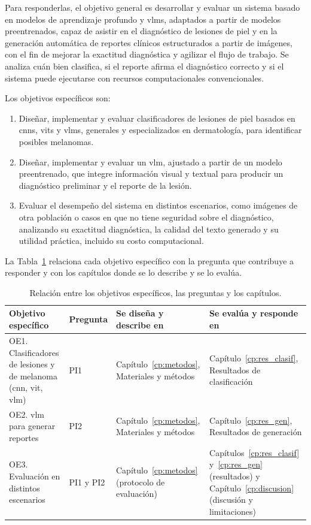 Para responderlas, el objetivo general es desarrollar y evaluar un sistema basado en modelos de aprendizaje
profundo y \glspl{vlm}, adaptados a partir de modelos preentrenados, capaz de asistir en el diagnóstico de lesiones de piel y en la
generación automática de reportes clínicos estructurados a partir de imágenes, con el fin de mejorar la
exactitud diagnóstica y agilizar el flujo de trabajo. Se analiza cuán bien clasifica, si el reporte afirma el
diagnóstico correcto y si el sistema puede ejecutarse con recursos computacionales convencionales.

Los objetivos específicos son:
\begin{enumerate}[label=\textbf{OE\arabic*.}]
  \item Diseñar, implementar y evaluar clasificadores de lesiones de piel basados en \glspl{cnn}, \glspl{vit}
  y \glspl{vlm}, generales y especializados en dermatología, para identificar posibles melanomas.
  \item Diseñar, implementar y evaluar un \gls{vlm}, ajustado a partir de un modelo preentrenado, que integre
  información visual y textual para producir un diagnóstico preliminar y el reporte de la lesión.
  \item Evaluar el desempeño del sistema en distintos escenarios, como imágenes de otra población o casos en
  que no tiene seguridad sobre el diagnóstico, analizando su exactitud diagnóstica, la calidad del texto
  generado y su utilidad práctica, incluido su costo computacional.
\end{enumerate}

La Tabla~\ref{tab:intro_objetivos_preguntas} relaciona cada objetivo específico con la pregunta que contribuye a
responder y con los capítulos donde se lo describe y se lo evalúa.

\begin{table}[H]
  \centering
  \caption{Relación entre los objetivos específicos, las preguntas y los capítulos.}
  \label{tab:intro_objetivos_preguntas}
  \small
  \begin{tabularx}{\textwidth}{@{}>{\raggedright\arraybackslash}p{}p{}
    >{\raggedright\arraybackslash}X>{\raggedright\arraybackslash}X@{}}
    \toprule
    \textbf{Objetivo específico} & \textbf{Pregunta} & \textbf{Se diseña y describe en} & \textbf{Se evalúa y responde en} \\
    \midrule
    OE1. Clasificadores de lesiones y de melanoma (\gls{cnn}, \gls{vit}, \gls{vlm}) & PI1 &
      Capítulo~\ref{cp:metodos}, Materiales y métodos &
      Capítulo~\ref{cp:res_clasif}, Resultados de clasificación \\
    \filasep
    OE2. \gls{vlm} para generar reportes & PI2 &
      Capítulo~\ref{cp:metodos}, Materiales y métodos &
      Capítulo~\ref{cp:res_gen}, Resultados de generación \\
    \filasep
    OE3. Evaluación en distintos escenarios & PI1 y PI2 &
      Capítulo~\ref{cp:metodos} (protocolo de evaluación) &
      Capítulos~\ref{cp:res_clasif} y~\ref{cp:res_gen} (resultados) y Capítulo~\ref{cp:discusion} (discusión y
      limitaciones) \\
    \bottomrule
  \end{tabularx}
\end{table}

